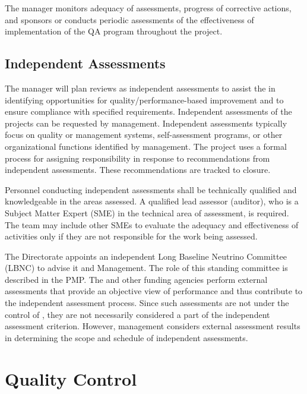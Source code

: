 The   manager monitors adequacy of
assessments, progress of corrective actions, and sponsors or conducts
periodic assessments of the effectiveness of implementation of the QA
program throughout the  project.




\subsection{Independent Assessments}

The   manager will plan reviews as
independent assessments to assist the   in
identifying opportunities for quality/performance-based improvement
and to ensure compliance with specified requirements. Independent
assessments of the  projects can be requested by
 management. Independent assessments typically focus on
quality or  management systems, self-assessment programs, or
other organizational functions identified by management. The
 project uses a formal process for assigning
responsibility in response to recommendations from independent
assessments. These recommendations are tracked to closure.

Personnel conducting independent assessments shall be technically
qualified and knowledgeable in the areas assessed. A qualified lead
assessor (auditor), who is a Subject Matter Expert (SME) in the
technical area of assessment, is required. The team may include other
SMEs to evaluate the adequacy and effectiveness of activities only if
they are not responsible for the work being assessed.

The \fnal Directorate appoints an independent Long Baseline Neutrino
Committee (LBNC) to advise it and  Management. The role of
this standing committee is described in the 
PMP. The  and other funding agencies perform external
assessments that provide an objective view of performance and thus
contribute to the independent assessment process. Since such
assessments are not under the control of , they are not
necessarily considered a part of the independent assessment
criterion. However,  management considers external
assessment results in determining the scope and schedule of
independent assessments.

\section{ Quality Control}
  
